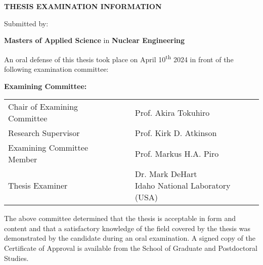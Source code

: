 \cleardoublepage
\thispagestyle{plain}

\begin{center}
\textbf{THESIS EXAMINATION INFORMATION}

\bigskip

Submitted by:  \makeatletter\textbf{\@firstname\ {\@lastname}}\makeatother

\bigskip
\bigskip

\textbf{Masters of Applied Science} in \textbf{Nuclear Engineering}

\end{center}


\bigskip
\bigskip

\noindent {}

\bigskip

An oral defense of this thesis took place on April 10\textsuperscript{th} 2024 in front of the following examination committee:

\medskip

\noindent\textbf{Examining Committee:}

\bigskip

\begingroup
\renewcommand{\arraystretch}{2}
\begin{tabular}{lcl}
    Chair of Examining Committee &\phantom{Alphabet} & Prof. Akira Tokuhiro \\
    Research Supervisor && Prof. Kirk D. Atkinson\\
    Examining Committee Member && Prof. Markus H.A. Piro \\
    Thesis Examiner && \makecell[l]{ Dr. Mark DeHart \\ Idaho National Laboratory (USA) }\\
\end{tabular}
\endgroup

\bigskip

\noindent The above committee determined that the thesis is acceptable in form and content and that a satisfactory knowledge of the field covered by the thesis was demonstrated by the candidate during an oral examination. A signed copy of the Certificate of Approval is available from the School of Graduate and Postdoctoral Studies.